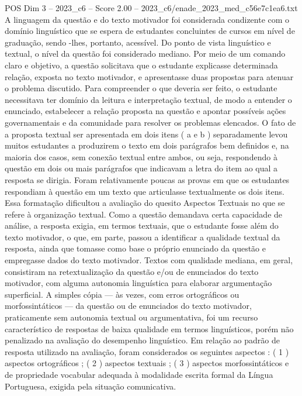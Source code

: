 \begin{textsample}{POS Dim 3 – 2023\_c6 – Score 2.00 – 2023\_c6/enade\_2023\_med\_c56e7c1ea6.txt}
A linguagem da questão e do texto motivador foi considerada condizente com o domínio linguístico que se espera de estudantes concluintes de cursos em nível de graduação, sendo -lhes, portanto, acessível.
Do ponto de vista linguístico e textual, o nível da questão foi considerado mediano.
Por meio de um comando claro e objetivo, a questão solicitava que o estudante explicasse determinada relação, exposta no texto motivador, e apresentasse duas propostas para atenuar o problema discutido.
Para compreender o que deveria ser feito, o estudante necessitava ter domínio da leitura e interpretação textual, de modo a entender o enunciado, estabelecer a relação proposta na questão e apontar possíveis ações governamentais e da comunidade para resolver os problemas elencados.
O fato de a proposta textual ser apresentada em dois itens ( a e b ) separadamente levou muitos estudantes a produzirem o texto em dois parágrafos bem definidos e, na maioria dos casos, sem conexão textual entre ambos, ou seja, respondendo à questão em dois ou mais parágrafos que indicavam a letra do item ao qual a resposta se dirigia.
Foram relativamente poucas as provas em que os estudantes respondiam à questão em um texto que articulasse textualmente os dois itens.
Essa formatação dificultou a avaliação do quesito Aspectos Textuais no que se refere à organização textual.
Como a questão demandava certa capacidade de análise, a resposta exigia, em termos textuais, que o estudante fosse além do texto motivador, o que, em parte, passou a identificar a qualidade textual da resposta, ainda que tomasse como base o próprio enunciado da questão e empregasse dados do texto motivador.
Textos com qualidade mediana, em geral, consistiram na retextualização da questão e/ou de enunciados do texto motivador, com alguma autonomia linguística para elaborar argumentação superficial.
A simples cópia — às vezes, com erros ortográficos ou morfossintáticos — da questão ou de enunciados do texto motivador, praticamente sem autonomia textual ou argumentativa, foi um recurso característico de respostas de baixa qualidade em termos linguísticos, porém não penalizado na avaliação do desempenho linguístico.
Em relação ao padrão de resposta utilizado na avaliação, foram considerados os seguintes aspectos : ( 1 ) aspectos ortográficos ; ( 2 ) aspectos textuais ; ( 3 ) aspectos morfossintáticos e de propriedade vocabular adequada à modalidade escrita formal da Língua Portuguesa, exigida pela situação comunicativa.

\end{textsample}
